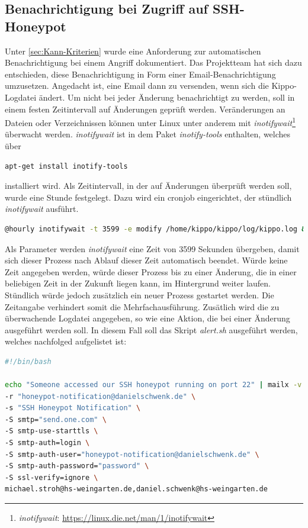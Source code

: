 \subsection{Benachrichtigung bei Zugriff auf SSH-Honeypot}
\label{subsec:Benachrichtigung bei Zugriff auf SSH-Honeypot}

Unter \ref{sec:Kann-Kriterien} wurde eine Anforderung zur automatischen Benachrichtigung bei einem Angriff dokumentiert. Das Projektteam hat sich dazu entschieden, diese Benachrichtigung in Form einer Email-Benachrichtigung umzusetzen. Angedacht ist, eine Email dann zu versenden, wenn sich die Kippo-Logdatei ändert. Um nicht bei jeder Änderung benachrichtigt zu werden, soll in einem festen Zeitintervall auf Änderungen geprüft werden. Veränderungen an Dateien oder Verzeichnissen können unter Linux unter anderem mit \textit{inotifywait}\footnote{ \textit{inotifywait}: \url{https://linux.die.net/man/1/inotifywait}} überwacht werden. \textit{inotifywait} ist in dem Paket \textit{inotify-tools} enthalten, welches über

\begin{lstlisting}[language=bash,style=customccolor]
apt-get install inotify-tools 
\end{lstlisting}

installiert wird. Als Zeitintervall, in der auf Änderungen überprüft werden soll, wurde eine Stunde festgelegt. Dazu wird ein cronjob eingerichtet, der stündlich \textit{inotifywait} ausführt.

\begin{lstlisting}[language=bash,style=customccolor]
@hourly inotifywait -t 3599 -e modify /home/kippo/kippo/log/kippo.log && /home/dschwenk/email-alert/alert.sh
\end{lstlisting}

Als Parameter werden \textit{inotifywait} eine Zeit von 3599 Sekunden übergeben, damit sich dieser Prozess nach Ablauf dieser Zeit automatisch beendet. Würde keine Zeit angegeben werden, würde dieser Prozess bis zu einer Änderung, die in einer beliebigen Zeit in der Zukunft liegen kann, im Hintergrund weiter laufen. Stündlich würde jedoch zusätzlich ein neuer Prozess gestartet werden. Die Zeitangabe verhindert somit die Mehrfachausführung. Zusätlich wird die zu überwachende Logdatei angegeben, so wie eine Aktion, die bei einer Änderung ausgeführt werden soll. In diesem Fall soll das Skript \textit{alert.sh} ausgeführt werden, welches nachfolged aufgelistet ist:

\begin{lstlisting}[language=bash,style=customccolor]
#!/bin/bash

echo "Someone accessed our SSH honeypot running on port 22" | mailx -v \
-r "honeypot-notification@danielschwenk.de" \
-s "SSH Honeypot Notification" \
-S smtp="send.one.com" \
-S smtp-use-starttls \
-S smtp-auth=login \
-S smtp-auth-user="honeypot-notification@danielschwenk.de" \
-S smtp-auth-password="password" \
-S ssl-verify=ignore \
michael.stroh@hs-weingarten.de,daniel.schwenk@hs-weingarten.de
\end{lstlisting}

